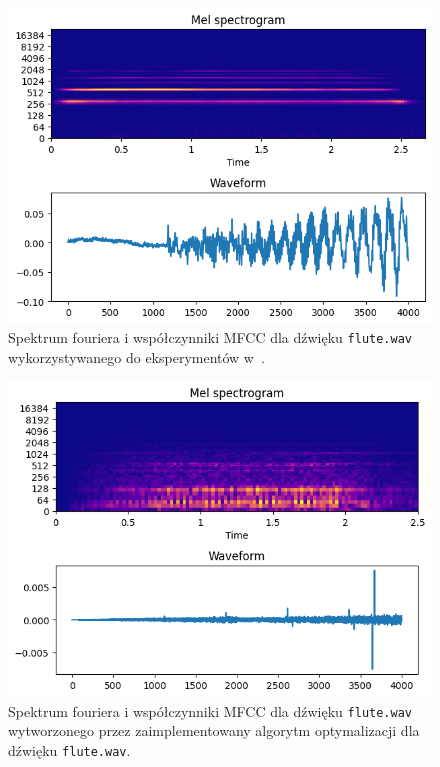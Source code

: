 \begin{multicols}{3}
\begin{figure}[H]
    \centering
    \includegraphics[width=0.9\linewidth]{rys06/target_sample_flute_literature.png}
    \caption{
      Spektrum fouriera i współczynniki MFCC dla dźwięku \texttt{flute.wav} wykorzystywanego
      do eksperymentów w~\cite{evolutionary_puredata_results}.
    }\label{fig:literature_flute_sound_overview}
\end{figure}

\begin{figure}[H]
    \centering
    \includegraphics[width=0.9\linewidth]{rys06/evolved_sample_flute.png}
    \caption{
      Spektrum fouriera i współczynniki MFCC dla dźwięku \texttt{flute.wav}
      wytworzonego przez zaimplementowany algorytm optymalizacji
      dla dźwięku \texttt{flute.wav}.
    }\label{fig:evolved_flute_sound_overview}
\end{figure}


\end{multicols}
